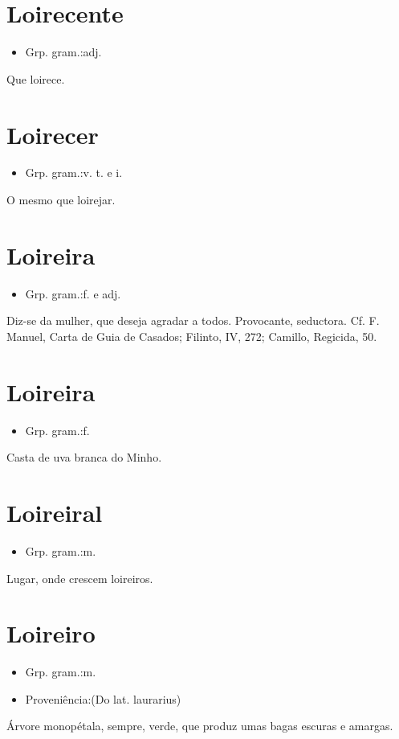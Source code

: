 \section{Loirecente}
\begin{itemize}
\item {Grp. gram.:adj.}
\end{itemize}
Que loirece.
\section{Loirecer}
\begin{itemize}
\item {Grp. gram.:v. t.  e  i.}
\end{itemize}
O mesmo que \textunderscore loirejar\textunderscore .
\section{Loireira}
\begin{itemize}
\item {Grp. gram.:f.  e  adj.}
\end{itemize}
Diz-se da mulher, que deseja agradar a todos.
Provocante, seductora. Cf. F. Manuel, \textunderscore Carta de Guia de Casados\textunderscore ; Filinto, IV, 272; Camillo, \textunderscore Regicida\textunderscore , 50.
\section{Loireira}
\begin{itemize}
\item {Grp. gram.:f.}
\end{itemize}
Casta de uva branca do Minho.
\section{Loireiral}
\begin{itemize}
\item {Grp. gram.:m.}
\end{itemize}
Lugar, onde crescem loireiros.
\section{Loireiro}
\begin{itemize}
\item {Grp. gram.:m.}
\end{itemize}
\begin{itemize}
\item {Proveniência:(Do lat. \textunderscore laurarius\textunderscore )}
\end{itemize}
Árvore monopétala, sempre, verde, que produz umas bagas escuras e amargas.
